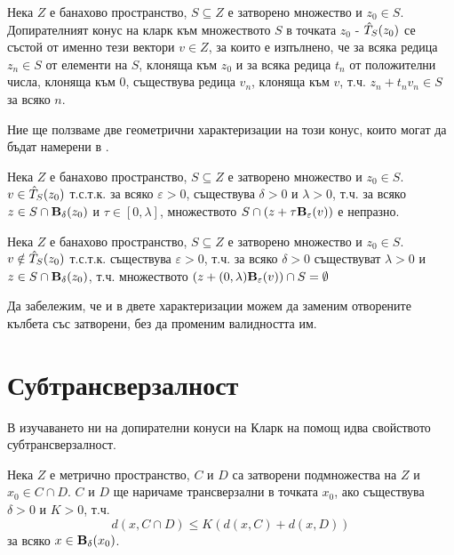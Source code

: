\begin{definition}
    Нека $Z$ е банахово пространство, $S\subseteq Z$ е затворено множество и $z_0\in S$. Допирателният конус на кларк към множеството $S$ в точката $z_0$ - $\hat T_S(z_0)$ се състой от именно тези вектори $v\in Z$, за които е изпълнено, че за всяка редица $z_n\in S$ от елементи на $S$, клоняща към $z_0$ и за всяка редица $t_n$ от положителни числа, клоняща към 0, съществува редица $v_n$, клоняща към $v$, т.ч. $z_n+t_n v_n\in S$ за всяко $n$.
\end{definition}

Ние ще ползваме две геометрични характеризации на този конус, които могат да бъдат намерени в \cite{Treiman}.
\begin{theorem} \label{Geometric}
    Нека $Z$ е банахово пространство, $S\subseteq Z$ е затворено множество и $z_0\in S$.
    $v \in \hat T_S(z_0)$ т.с.т.к. за всяко $\varepsilon > 0$, съществува $\delta > 0$ и $\lambda > 0$, т.ч. за всяко $z \in S \cap \textbf{B}_{\delta}(z_0)$ и $\tau\in[0,\lambda]$, множеството $S\cap (z + \tau \textbf{B}_{\varepsilon}(v))$ е непразно.
\end{theorem}

\begin{theorem} \label{Treiman}
    Нека $Z$ е банахово пространство, $S\subseteq Z$ е затворено множество и $z_0\in S$.
    $v \notin \hat T_S(z_0)$ т.с.т.к. съществува $\varepsilon > 0$, т.ч. за всяко $\delta > 0$ съществуват $\lambda > 0$ и $z \in S \cap \textbf{B}_{\delta}(z_0)$, т.ч. множеството $(z + (0, \lambda)\textbf{B}_{\varepsilon}(v)) \cap S = \emptyset$
\end{theorem}

Да забележим, че и в двете характеризации можем да заменим отворените кълбета със затворени, без да променим валидността им.

\section{Субтрансверзалност}
В изучаването ни на допирателни конуси на Кларк на помощ идва свойството субтрансверзалност.
\begin{definition}
    Нека $Z$ е метрично пространство, $C$ и $D$ са затворени подмножества на $Z$ и $x_0\in C\cap D$.
    $C$ и $D$ ще наричаме трансверзални в точката $x_0$, ако съществува $\delta > 0$ и $K > 0$, т.ч.
    \[
        d(x, C\cap D) \leq K(d(x, C) + d(x, D))
    \]
    за всяко $x\in \textbf{B}_{\delta}(x_0)$.
\end{definition}

